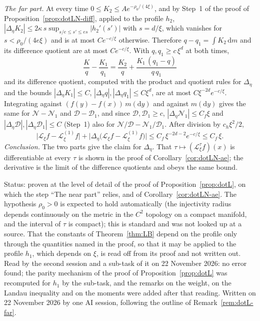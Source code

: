 \documentclass[11pt,a4paper]{article}
\makeatletter
\theoremstyle{stmt}
\theoremstyle{defn}
\theoremstyle{rmk}
\renewenvironment{proof}[1][\proofname]{\par\pushQED{\qed}\normalfont\topsep6\p@\@plus6\p@\relax
  \trivlist\item[\hskip\labelsep{\sffamily\itshape\small #1.}]\ignorespaces}{\popQED\endtrivlist\@endpefalse}
\numberwithin{equation}{section}
\newcommand{\status}[1]{\par\noindent\textsf{\small Status: #1}\par}
\newcommand{\Lc}{\mathcal{L}}
\newcommand{\dd}{\mathrm{d}}
\makeatother
\begin{document}
{\begin{proof}
\emph{The far part.} At every time $0\le K_2\le Ae^{-\rho_0/(4\xi)}$, and by Step~1 of the proof of Proposition~\ref{prop:dotLN-diff}, applied to the profile $h_2$, $|\Delta_\eta K_2|\le2\kappa\,s\sup_{s/e\le s'\le es}|h_2'(s')|$ with $s=d/\xi$, which vanishes for $s<\rho_0/(4e\xi)$ and is at most $Ce^{-c/\xi}$ otherwise. Therefore $q-q_1=\int K_2\,\dd m$ and its difference quotient are at most $Ce^{-c/\xi}$. With $q,q_1\ge c\,\xi^d$ at both times,
\[
\frac K q-\frac{K_1}{q_1}=\frac{K_2}{q}+\frac{K_1\,(q_1-q)}{q\,q_1}
\]
and its difference quotient, computed with the product and quotient rules for $\Delta_\eta$ and the bounds $|\Delta_\eta K_1|\le C$, $|\Delta_\eta q|,|\Delta_\eta q_1|\le C\xi^d$, are at most $C\xi^{-2d}e^{-c/\xi}$. Integrating against $(f(y)-f(x))\,m(\dd y)$ and against $m(\dd y)$ gives the same for $\mathcal N-\mathcal N_1$ and $\mathcal D-\mathcal D_1$, and since $\mathcal D,\mathcal D_1\ge c$, $|\Delta_\eta\mathcal N_1|\le C_f\xi$ and $|\Delta_\eta\mathcal D|,|\Delta_\eta\mathcal D_1|\le C$ (Step~1) also for $\mathcal N/\mathcal D-\mathcal N_1/\mathcal D_1$. After division by $c_h\xi^2/2$,
\[
\big|\Lc_\xi f-\Lc^{(1)}_\xi f\big|+\big|\Delta_\eta\big(\Lc_\xi f-\Lc^{(1)}_\xi f\big)\big|\le C_f\,\xi^{-2d-2}e^{-c/\xi}\le C_f\,\xi .
\]
\emph{Conclusion.} The two parts give the claim for $\Delta_\eta$. That $\tau\mapsto(\Lc^\tau_\xi f)(x)$ is differentiable at every $\tau$ is shown in the proof of Corollary~\ref{cor:dotLN-ae}; the derivative is the limit of the difference quotients and obeys the same bound.
\end{proof}
\status{proven at the level of detail of the proof of Proposition~\ref{prop:dotL}, on which the step ``The near part'' relies, and of Corollary~\ref{cor:dotLN-ae}. The hypothesis $\rho_0>0$ is expected to hold automatically (the injectivity radius depends continuously on the metric in the $C^2$ topology on a compact manifold, and the interval of $\tau$ is compact); this is standard and was not looked up at a source. That the constants of Theorem~\ref{thm:LB} depend on the profile only through the quantities named in the proof, so that it may be applied to the profile $h_1$, which depends on $\xi$, is read off from its proof and not written out. Read by the second session and a sub-task of it on 22 November 2026: no error found; the parity mechanism of the proof of Proposition~\ref{prop:dotL} was recomputed for $h_1$ by the sub-task, and the remarks on the weight, on the Landau inequality and on the moments were added after that reading. Written on 22 November 2026 by one AI session, following the outline of Remark~\ref{rem:dotL-far}.}

}
\end{document}
